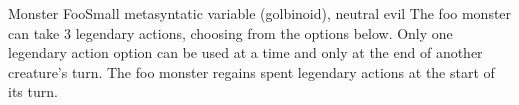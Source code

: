 \documentclass[10pt]{article}
\begin{document}
\begin{multicols}{2}
\begin{monster}{Monster Foo}{Small metasyntatic variable (golbinoid), neutral evil}
     The foo monster can take 3 legendary actions, choosing from the options below. Only one legendary action option can be used at a time and only at the end of another creature's turn. The foo monster regains spent legendary actions at the start of its turn.\\ \vspace{1ex}
    \end{monster}
    \lipsum
\end{multicols}
\end{document}
